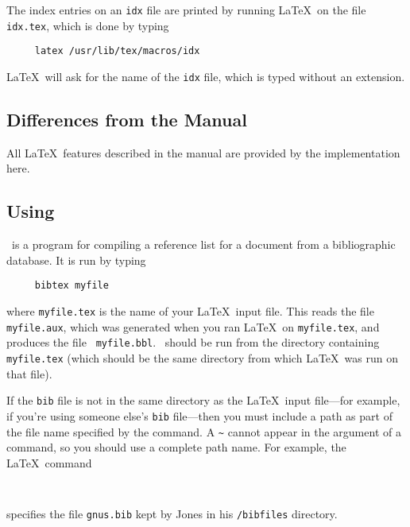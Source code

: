 The index entries on an {\tt idx} file are printed by running \LaTeX\
on the file \mbox{\tt idx.tex}, which is done by typing
\begin{verbatim}
     latex /usr/lib/tex/macros/idx
\end{verbatim}
\LaTeX\ will ask for the name of the {\tt idx} file, which is typed
without an extension.

\subsection{Differences from the Manual}

All \LaTeX\ features described in the manual are provided by 
the implementation here.





\subsection{Using \BibTeX}

\BibTeX\ is a program for compiling a reference list for a document
from a bibliographic database.  It is run by typing
\begin{verbatim}
     bibtex myfile
\end{verbatim}
where \mbox{\tt myfile.tex} is the name of your \LaTeX\ input file.
This reads the file \mbox{\tt myfile.aux}, which was generated when you
ran \LaTeX\ on \mbox{\tt myfile.tex}, and produces the file \mbox{\tt
myfile.bbl}.  \BibTeX\ should be run from the directory containing
\mbox{\tt myfile.tex} (which should be the same directory from which
\LaTeX\ was run on that file).

If the {\tt bib} file is not in the same directory as the \LaTeX\ input
file---for example, if you're using someone else's {\tt bib}
file---then you must include a path as part of the file name specified
by the \hbox{\verb||} command.  A \verb|~| cannot appear
in the argument of a \hbox{\verb||} command, so you should
use a complete path name.  For example, the \LaTeX\ command
\begin{verbatim}
     
\end{verbatim}
specifies the file \mbox{\tt gnus.bib} kept by Jones in his 
\mbox{\tt /bibfiles} directory.

